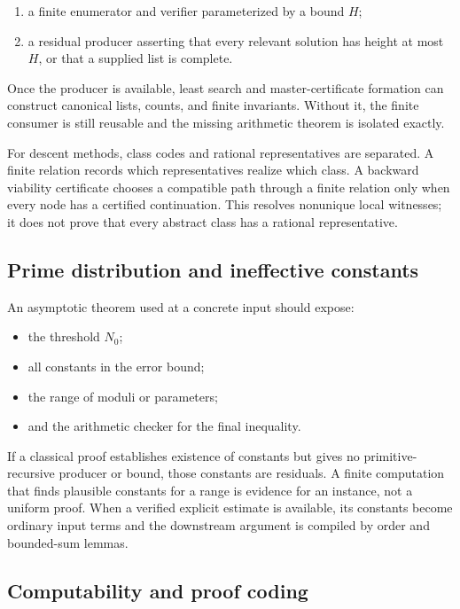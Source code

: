 \begin{enumerate}
\item a finite enumerator and verifier parameterized by a bound \(H\);
\item a residual producer asserting that every relevant solution has height
      at most \(H\), or that a supplied list is complete.
\end{enumerate}

Once the producer is available, least search and master-certificate formation
can construct canonical lists, counts, and finite invariants.  Without it, the
finite consumer is still reusable and the missing arithmetic theorem is
isolated exactly.

For descent methods, class codes and rational representatives are separated.
A finite relation records which representatives realize which class.  A
backward viability certificate chooses a compatible path through a finite
relation only when every node has a certified continuation.  This resolves
nonunique local witnesses; it does not prove that every abstract class has a
rational representative.

\subsection{Prime distribution and ineffective constants}

An asymptotic theorem used at a concrete input should expose:

\begin{itemize}
\item the threshold \(N_0\);
\item all constants in the error bound;
\item the range of moduli or parameters;
\item and the arithmetic checker for the final inequality.
\end{itemize}

If a classical proof establishes existence of constants but gives no
primitive-recursive producer or bound, those constants are residuals.  A
finite computation that finds plausible constants for a range is evidence for
an instance, not a uniform proof.  When a verified explicit estimate is
available, its constants become ordinary input terms and the downstream
argument is compiled by order and bounded-sum lemmas.

\subsection{Computability and proof coding}

